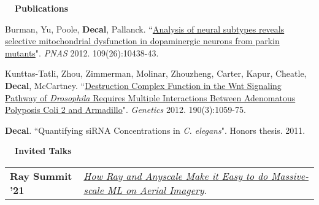 \documentclass[a4paper,12pt]{article}
\newcommand{\resheading}[1]{{\vspace*{.001in} \colorbox{mygrey}{\begin{minipage}{\textwidth}{\textmd{\large \textbf{#1} \vphantom{p\^{E}}}}\end{minipage}}} }
\begin{document}
%
%

    \resheading{~~Publications}
    \vspace{-1em}
    {\setlength{\parskip}{8pt}

    Burman, Yu, Poole, \textbf{Decal}, Pallanck. ``\href{http://www.pnas.org/content/early/2012/06/12/1120688109}{Analysis of neural subtypes reveals selective mitochondrial dysfunction in dopaminergic neurons from parkin mutants}". \textit{PNAS} 2012. 109(26):10438-43.

    Kunttas-Tatli, Zhou, Zimmerman, Molinar, Zhouzheng, Carter, Kapur, Cheatle, \textbf{Decal}, McCartney. ``\href{http://www.genetics.org/content/190/3/1059.full}{Destruction Complex Function in the Wnt Signaling Pathway of \textit{Drosophila} Requires Multiple Interactions Between Adenomatous Polyposis Coli 2 and Armadillo}". \textit{Genetics} 2012. 190(3):1059-75.

    \textbf{\textbf{Decal}}. ``Quantifying siRNA Concentrations in \textit{C. elegans}". Honors thesis. 2011.\\

    }

    \resheading{~~Invited Talks}
    \vspace{-1.5em}

    \begin{tabularx}{\textwidth}{p{3cm}>{\arraybackslash}X}  %

        \bfseries{Ray Summit '21} & \href{https://raysummit.anyscale.com/content/Videos/dJRSr3NJLSP4h9CT8}{\textit{How Ray and Anyscale Make it Easy to do Massive-scale ML on Aerial Imagery}}.\\
    \end{tabularx}
\end{document}
